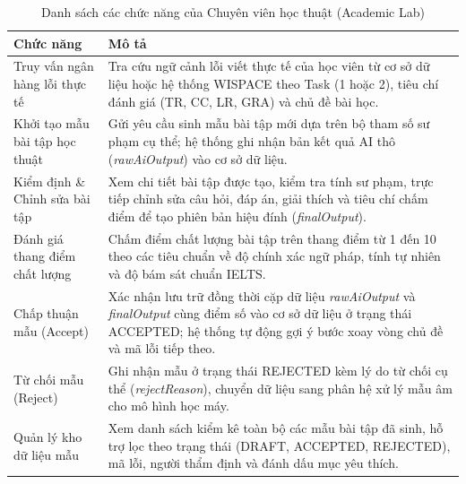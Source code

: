 \begin{table}[H]
\centering
\caption{Danh sách các chức năng của Chuyên viên học thuật (Academic Lab)}
\label{aihub:tab:func_academic}
\small
\begin{tabular}{|p{4.2cm}|p{\dimexpr\linewidth-4.2cm-4\tabcolsep-3\arrayrulewidth\relax}|}
\hline
\textbf{Chức năng} & \textbf{Mô tả} \\ \hline
Truy vấn ngân hàng lỗi thực tế & Tra cứu ngữ cảnh lỗi viết thực tế của học viên từ cơ sở dữ liệu hoặc hệ thống WISPACE theo Task (1 hoặc 2), tiêu chí đánh giá (TR, CC, LR, GRA) và chủ đề bài học. \\ \hline
Khởi tạo mẫu bài tập học thuật & Gửi yêu cầu sinh mẫu bài tập mới dựa trên bộ tham số sư phạm cụ thể; hệ thống ghi nhận bản kết quả AI thô (\textit{rawAiOutput}) vào cơ sở dữ liệu. \\ \hline
Kiểm định \& Chỉnh sửa bài tập & Xem chi tiết bài tập được tạo, kiểm tra tính sư phạm, trực tiếp chỉnh sửa câu hỏi, đáp án, giải thích và tiêu chí chấm điểm để tạo phiên bản hiệu đính (\textit{finalOutput}). \\ \hline
Đánh giá thang điểm chất lượng & Chấm điểm chất lượng bài tập trên thang điểm từ 1 đến 10 theo các tiêu chuẩn về độ chính xác ngữ pháp, tính tự nhiên và độ bám sát chuẩn IELTS. \\ \hline
Chấp thuận mẫu (Accept) & Xác nhận lưu trữ đồng thời cặp dữ liệu \textit{rawAiOutput} và \textit{finalOutput} cùng điểm số vào cơ sở dữ liệu ở trạng thái ACCEPTED; hệ thống tự động gợi ý bước xoay vòng chủ đề và mã lỗi tiếp theo. \\ \hline
Từ chối mẫu (Reject) & Ghi nhận mẫu ở trạng thái REJECTED kèm lý do từ chối cụ thể (\textit{rejectReason}), chuyển dữ liệu sang phân hệ xử lý mẫu âm cho mô hình học máy. \\ \hline
Quản lý kho dữ liệu mẫu & Xem danh sách kiểm kê toàn bộ các mẫu bài tập đã sinh, hỗ trợ lọc theo trạng thái (DRAFT, ACCEPTED, REJECTED), mã lỗi, người thẩm định và đánh dấu mục yêu thích. \\ \hline
\end{tabular}
\end{table}

